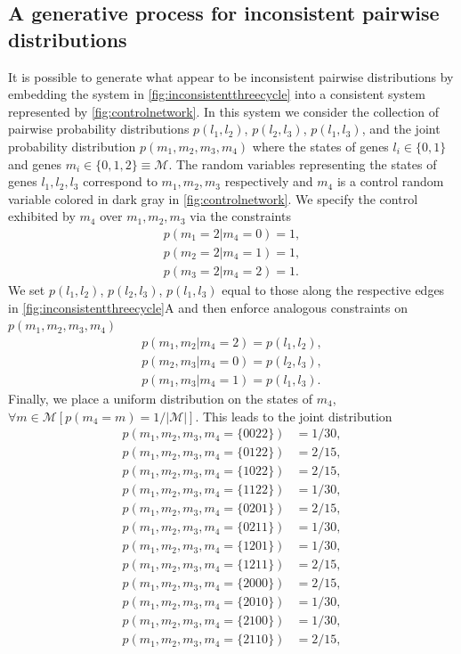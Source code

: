 \subsection{A generative process for inconsistent pairwise distributions}\label{sec:generativeprocessapparentinconsistency}
It is possible to generate what appear to be inconsistent pairwise distributions by embedding the system in \ref{fig:inconsistentthreecycle} into a consistent system represented by \ref{fig:controlnetwork}. In this system we consider the collection of pairwise probability distributions $p(l_1,l_2)$, $p(l_2,l_3)$, $p(l_1,l_3)$, and the joint probability distribution $p(m_1,m_2,m_3,m_4)$ where the states of genes $l_i \in \{ 0, 1\}$ and genes $m_i \in \{0,1,2\} \equiv \mathcal{M}$. The random variables representing the states of genes $l_1,l_2,l_3$ correspond to $m_1,m_2,m_3$ respectively and $m_4$ is a control random variable colored in dark gray in \ref{fig:controlnetwork}. We specify the control exhibited by $m_4$ over $m_1,m_2,m_3$ via the constraints
\begin{align*}
p(m_1=2|m_4=0)=1,\\
p(m_2=2|m_4=1)=1,\\
p(m_3=2|m_4=2)=1.
\end{align*}
We set $p(l_1,l_2)$, $p(l_2,l_3)$, $p(l_1,l_3)$ equal to those along the respective edges in \ref{fig:inconsistentthreecycle}A and then enforce analogous constraints on $p(m_1,m_2,m_3,m_4)$
\begin{align*}
p(m_1,m_2|m_4=2)=p(l_1,l_2),\\
p(m_2,m_3|m_4=0)=p(l_2,l_3),\\
p(m_1,m_3|m_4=1)=p(l_1,l_3).
\end{align*}
Finally, we place a uniform distribution on the states of $m_4$, $\forall m \in \mathcal{M} \left[ p(m_4=m) = 1/|\mathcal{M}| \right]$. This leads to the joint distribution
\begin{align*}
p(m_1,m_2,m_3,m_4=\{0022\})&=1/30,\\
p(m_1,m_2,m_3,m_4=\{0122\})&=2/15,\\
p(m_1,m_2,m_3,m_4=\{1022\})&=2/15,\\
p(m_1,m_2,m_3,m_4=\{1122\})&=1/30,\\
p(m_1,m_2,m_3,m_4=\{0201\})&=2/15,\\
p(m_1,m_2,m_3,m_4=\{0211\})&=1/30,\\
p(m_1,m_2,m_3,m_4=\{1201\})&=1/30,\\
p(m_1,m_2,m_3,m_4=\{1211\})&=2/15,\\
p(m_1,m_2,m_3,m_4=\{2000\})&=2/15,\\
p(m_1,m_2,m_3,m_4=\{2010\})&=1/30,\\
p(m_1,m_2,m_3,m_4=\{2100\})&=1/30,\\
p(m_1,m_2,m_3,m_4=\{2110\})&=2/15,
\end{align*}
